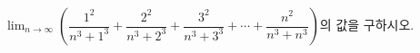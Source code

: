 \hspace*{2mm}\begin{minipage}[t]{\dimexpr\linewidth-2mm\relax}\vspace{0pt}
$\displaystyle\lim_{n\to\infty}\left(\dfrac{1^2}{n^3+1^3}+\dfrac{2^2}{n^3+2^3}+\dfrac{3^2}{n^3+3^3}+\cdots+\dfrac{n^2}{n^3+n^3}\right)$의 값을 구하시오.\end{minipage}
